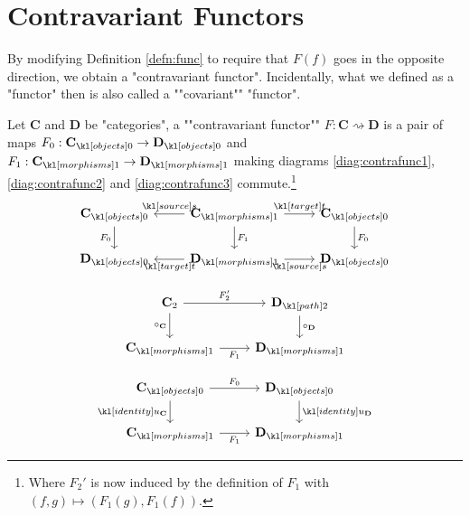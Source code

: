 \documentclass[main.tex]{subfiles}
\begin{document}
\section{Contravariant Functors}
By modifying Definition \ref{defn:func} to require that $F(f)$ goes in the opposite direction, we obtain a "contravariant functor". \AP Incidentally, what we defined as a "functor" then is also called a ""covariant"" "functor".%
\begin{defn}
	\AP Let $\mathbf{C}$ and $\mathbf{D}$ be "categories", a ""contravariant functor"" $F: \mathbf{C} \rightsquigarrow \mathbf{D}$ is a pair of maps $F_0:\obj{\mathbf{C}} \rightarrow \obj{\mathbf{D}}$ and $F_1:\mor{\mathbf{C}} \rightarrow \mor{\mathbf{D}}$ making diagrams \eqref{diag:contrafunc1}, \eqref{diag:contrafunc2} and \eqref{diag:contrafunc3} commute.\footnote{Where $F_2'$ is now induced by the definition of $F_1$ with $(f,g) \mapsto (F_1(g), F_1(f))$.}
	\begin{equation}\label{diag:contrafunc1}
	\begin{tikzcd}
	\obj{\mathbf{C}} \arrow[d, "F_0"'] & \mor{\mathbf{C}} \arrow[d, "F_1"] \arrow[l, "\source"'] \arrow[r, "\target"] & \obj{\mathbf{C}} \arrow[d, "F_0"] \\
	\obj{\mathbf{D}} & \mor{\mathbf{D}} \arrow[l, "\target"] \arrow[r, "\source"'] & \obj{\mathbf{D}}
	\end{tikzcd}
	\end{equation}
	\begin{minipage}{0.49\textwidth}
		\begin{equation}\label{diag:contrafunc2}
		\begin{tikzcd}
		\mathbf{C}_2 \arrow[d, "\circ_{\mathbf{C}}"'] \arrow[r, "F_2'"] & \mortwo{\mathbf{D}} \arrow[d, "\circ_{\mathbf{D}}"] \\
		\mor{\mathbf{C}} \arrow[r, "F_1"'] & \mor{\mathbf{D}}
		\end{tikzcd}
		\end{equation}
	\end{minipage}
	\begin{minipage}{0.49\textwidth}
		\begin{equation}\label{diag:contrafunc3}
		\begin{tikzcd}
		\obj{\mathbf{C}} \arrow[d, "\idu_{\mathbf{C}}"'] \arrow[r, "F_0"] & \obj{\mathbf{D}} \arrow[d, "\idu_{\mathbf{D}}"] \\
		\mor{\mathbf{C}} \arrow[r, "F_1"'] & \mor{\mathbf{D}}
		\end{tikzcd}

\end{equation}
\end{minipage}
\end{defn}
\end{document}
